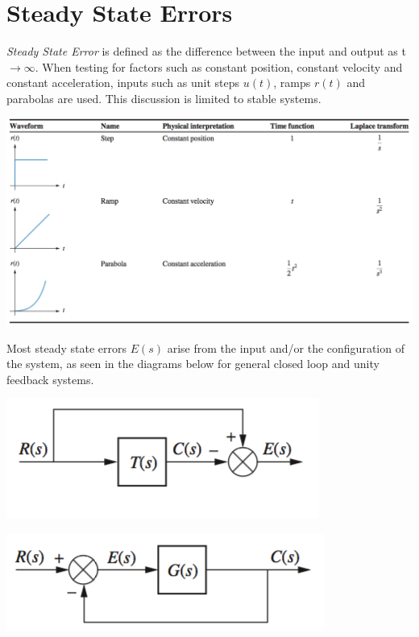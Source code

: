 \documentclass[11pt]{article}
\begin{document}
    \pagebreak


    \section{Steady State Errors}

    \textit{Steady State Error} is defined as the difference between the input and output as t $\rightarrow \infty$. When testing for factors such as constant position, constant velocity and constant acceleration, inputs such as unit steps $u(t)$, ramps $r(t)$ and parabolas are used. This discussion is limited to stable systems.\\
   
    \begin{center}
        \includegraphics[width=300 px]{img/inputs} \\
    \end{center}

    Most steady state errors $E(s)$ arise from the input and/or the configuration of the system, as seen in the diagrams below for general closed loop and unity feedback systems.

    \begin{center}
        \includegraphics[width=300 px]{img/closedlooperror} \\
    \end{center}

    \begin{center}
        \includegraphics[width=300 px]{img/unityfeedback} \\
    \end{center}
    
\end{document}
